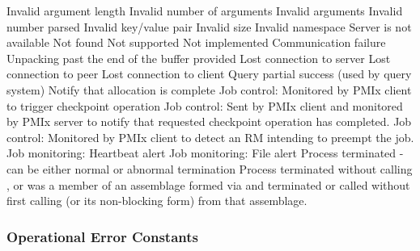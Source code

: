 \begin{constantdesc}
Invalid argument length
%
Invalid number of arguments
%
Invalid arguments
%
Invalid number parsed
%
Invalid key/value pair
%
Invalid size
%
Invalid namespace
%
Server is not available
%
Not found
%
Not supported
%
Not implemented
%
Communication failure
%
Unpacking past the end of the buffer provided
%
Lost connection to server
%
Lost connection to peer
%
Lost connection to client
%
Query partial success (used by query system)
%
Notify that allocation is complete
%
Job control: Monitored by PMIx client to trigger checkpoint operation
%
Job control: Sent by PMIx client and monitored by PMIx server to notify that requested checkpoint operation has completed.
%
Job control: Monitored by PMIx client to detect an \ac{RM} intending to preempt the job.
%
Job monitoring: Heartbeat alert
%
Job monitoring: File alert
%
Process terminated - can be either normal or abnormal termination
%
Process terminated without calling , or was a member of an assemblage formed via  and terminated or called  without first calling  (or its non-blocking form) from that assemblage.
%
\end{constantdesc}

\subsubsection{Operational Error Constants}

